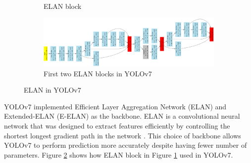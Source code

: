 \begin{figure}[H]
\begin{subfigure}[c][][b]{.2\textwidth}
        \caption{ELAN block}
        \label{fig:elan-block}
    \end{subfigure}\hfill%
    \begin{subfigure}[c][][c]{.75\textwidth}
        \includegraphics[width=1\linewidth]{figures/yolo-elan-blocks.png}
        \caption{First two ELAN blocks in YOLOv7}
        \label{fig:elan-yolo}
    \end{subfigure}\hfill%

    \caption{ELAN in YOLOv7}
    \label{fig:elan}
  \end{figure}


  YOLOv7 implemented Efficient Layer Aggregation Network (ELAN) and Extended-ELAN (E-ELAN) as the backbone. 
  ELAN is a convolutional neural network that was designed to extract features efficiently 
  by controlling the shortest longest gradient path in the network \parencite{elan}.
  This choice of backbone allows YOLOv7 to perform prediction more accurately despite having fewer number of parameters. 
  Figure \ref{fig:elan-yolo} shows how ELAN block in Figure \ref{fig:elan-block} used in YOLOv7.

